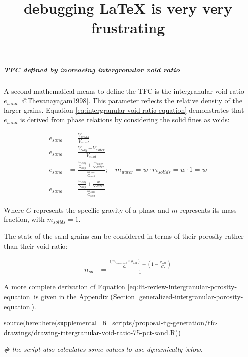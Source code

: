 \documentclass[
]{article}
\title{debugging \LaTeX{} is very very frustrating}
\author{}
\date{\vspace{-2.5em}}
\newenvironment{Shaded}{\begin{snugshade}}{\end{snugshade}}
\newcommand{\CommentTok}[1]{\textcolor[rgb]{0.56,0.35,0.01}{\textit{#1}}}
\newcommand{\FunctionTok}[1]{\textcolor[rgb]{0.00,0.00,0.00}{#1}}
\newcommand{\NormalTok}[1]{#1}
\newcommand{\SpecialCharTok}[1]{\textcolor[rgb]{0.00,0.00,0.00}{#1}}
\newcommand{\StringTok}[1]{\textcolor[rgb]{0.31,0.60,0.02}{#1}}
\begin{document}
\maketitle

{
\setcounter{tocdepth}{2}
\tableofcontents
}
\hypertarget{tfc-defined-by-increasing-intergranular-void-ratio}{%
\subparagraph{TFC defined by increasing intergranular void ratio}\label{tfc-defined-by-increasing-intergranular-void-ratio}}

A second mathematical means to define the TFC is the intergranular void ratio \(e_{sand}\) {[}@Thevanayagam1998{]}.
This parameter reflects the relative density of the larger grains.
Equation \eqref{eq:intergranular-void-ratio-equation} demonstrates that \(e_{sand}\) is derived from phase relations by considering the solid fines as voids:

\begin{align}
e_{sand} &= \frac{V_{voids}}{V_{sand}} \nonumber \\
e_{sand} &= \frac{V_{clay} + V_{water}}{V_{sand}} \nonumber \\
e_{sand} &= \frac{\frac{m_{clay}}{G_{clay}} + \frac{m_{water}}{Gwater}}{\frac{m_{sand}}{G_{sand}}}; \quad m_{water} = w \cdot m_{solids} = w \cdot 1 = w \nonumber \\
e_{sand} &= \frac{\frac{m_{clay}}{G_{clay}} + \frac{{w}}{Gwater}}{\frac{m_{sand}}{G_{sand}}}
\label{eq:intergranular-void-ratio-equation}
\end{align}

Where \(G\) represents the specific gravity of a phase and \(m\) represents its mass fraction, with \(m_{solids} = 1\).

The state of the sand grains can be considered in terms of their porosity rather than their void ratio:

\begin{align}
n_{sa}&=\frac{\frac{\left( m_{c_{mass-based}} \times  \rho_{bulk} \right)}{G_c}+\left( 1 - \frac{\rho_{bulk}}{G_s} \right)}{1}
\label{eq:lit-review-intergranular-porosity-equation}
\end{align}

A more complete derivation of Equation \eqref{eq:lit-review-intergranular-porosity-equation} is given in the Appendix (Section \ref{generalized-intergranular-porosity-equation}).

\begin{Shaded}
\begin{Highlighting}[]
\FunctionTok{source}\NormalTok{(here}\SpecialCharTok{::}\FunctionTok{here}\NormalTok{(}\StringTok{\textquotesingle{}supplemental\_R\_scripts/proposal{-}fig{-}generation/tfc{-}drawings/drawing{-}intergranular{-}void{-}ratio{-}75{-}pct{-}sand.R\textquotesingle{}}\NormalTok{))}

\CommentTok{\# the script also calculates some values to use dynamically below.}
\end{Highlighting}
\end{Shaded}
\end{document}

